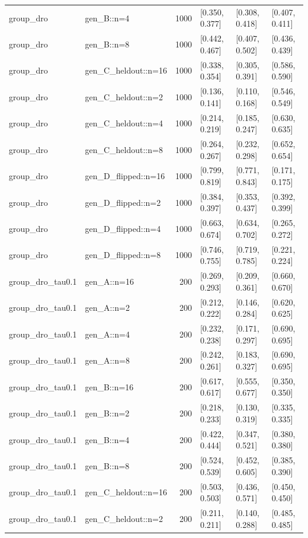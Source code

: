 \begin{tabular}{llrlll}
group\_dro & gen\_B::n=4 & 1000 & [0.350, 0.377] & [0.308, 0.418] & [0.407, 0.411] \\
group\_dro & gen\_B::n=8 & 1000 & [0.442, 0.467] & [0.407, 0.502] & [0.436, 0.439] \\
group\_dro & gen\_C\_heldout::n=16 & 1000 & [0.338, 0.354] & [0.305, 0.391] & [0.586, 0.590] \\
group\_dro & gen\_C\_heldout::n=2 & 1000 & [0.136, 0.141] & [0.110, 0.168] & [0.546, 0.549] \\
group\_dro & gen\_C\_heldout::n=4 & 1000 & [0.214, 0.219] & [0.185, 0.247] & [0.630, 0.635] \\
group\_dro & gen\_C\_heldout::n=8 & 1000 & [0.264, 0.267] & [0.232, 0.298] & [0.652, 0.654] \\
group\_dro & gen\_D\_flipped::n=16 & 1000 & [0.799, 0.819] & [0.771, 0.843] & [0.171, 0.175] \\
group\_dro & gen\_D\_flipped::n=2 & 1000 & [0.384, 0.397] & [0.353, 0.437] & [0.392, 0.399] \\
group\_dro & gen\_D\_flipped::n=4 & 1000 & [0.663, 0.674] & [0.634, 0.702] & [0.265, 0.272] \\
group\_dro & gen\_D\_flipped::n=8 & 1000 & [0.746, 0.755] & [0.719, 0.785] & [0.221, 0.224] \\
group\_dro\_tau0.1 & gen\_A::n=16 & 200 & [0.269, 0.293] & [0.209, 0.361] & [0.660, 0.670] \\
group\_dro\_tau0.1 & gen\_A::n=2 & 200 & [0.212, 0.222] & [0.146, 0.284] & [0.620, 0.625] \\
group\_dro\_tau0.1 & gen\_A::n=4 & 200 & [0.232, 0.238] & [0.171, 0.297] & [0.690, 0.695] \\
group\_dro\_tau0.1 & gen\_A::n=8 & 200 & [0.242, 0.261] & [0.183, 0.327] & [0.690, 0.695] \\
group\_dro\_tau0.1 & gen\_B::n=16 & 200 & [0.617, 0.617] & [0.555, 0.677] & [0.350, 0.350] \\
group\_dro\_tau0.1 & gen\_B::n=2 & 200 & [0.218, 0.233] & [0.130, 0.319] & [0.335, 0.335] \\
group\_dro\_tau0.1 & gen\_B::n=4 & 200 & [0.422, 0.444] & [0.347, 0.521] & [0.380, 0.380] \\
group\_dro\_tau0.1 & gen\_B::n=8 & 200 & [0.524, 0.539] & [0.452, 0.605] & [0.385, 0.390] \\
group\_dro\_tau0.1 & gen\_C\_heldout::n=16 & 200 & [0.503, 0.503] & [0.436, 0.571] & [0.450, 0.450] \\
group\_dro\_tau0.1 & gen\_C\_heldout::n=2 & 200 & [0.211, 0.211] & [0.140, 0.288] & [0.485, 0.485] \\

\end{tabular}
